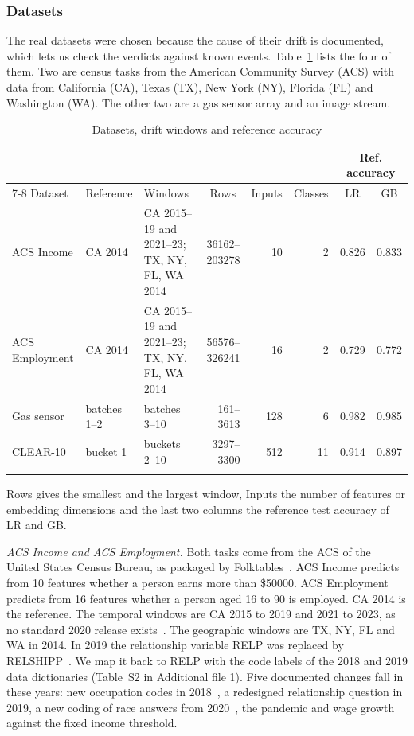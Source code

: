 \documentclass[pdflatex,referee,lineno,sn-basic]{sn-jnl}
\begin{document}
\subsubsection{Datasets}\label{sec:datasets}

The real datasets were chosen because the cause of their drift is documented, which lets us check the verdicts against known events. Table~\ref{tab:datasets} lists the four of them. Two are census tasks from the American Community Survey (ACS) with data from California (CA), Texas (TX), New York (NY), Florida (FL) and Washington (WA). The other two are a gas sensor array and an image stream.

\begin{table}[!htbp]\centering\tablebodyfont
\caption{Datasets, drift windows and reference accuracy}\label{tab:datasets}%
\setlength{\tabcolsep}{4pt}
\begin{tabularx}{\textwidth}{@{}ll>{\raggedright\arraybackslash}Xrrrrr@{}}
\toprule
 &  &  & \multicolumn{1}{c}{} & \multicolumn{1}{c}{} & \multicolumn{1}{c}{} & \multicolumn{2}{c}{Ref. accuracy} \\
\cmidrule(lr){7-8}
Dataset & Reference & Windows & \multicolumn{1}{c}{Rows} & \multicolumn{1}{c}{Inputs} & \multicolumn{1}{c}{Classes} & \multicolumn{1}{c}{LR} & \multicolumn{1}{c}{GB} \\
\midrule
ACS Income & CA 2014 & CA 2015--19 and 2021--23; TX, NY, FL, WA 2014 & 36162--203278 & 10 & 2 & 0.826 & 0.833 \\
ACS Employment & CA 2014 & CA 2015--19 and 2021--23; TX, NY, FL, WA 2014 & 56576--326241 & 16 & 2 & 0.729 & 0.772 \\
Gas sensor & batches 1--2 & batches 3--10 & 161--3613 & 128 & 6 & 0.982 & 0.985 \\
CLEAR-10 & bucket 1 & buckets 2--10 & 3297--3300 & 512 & 11 & 0.914 & 0.897 \\
\botrule
\end{tabularx}
\end{table}

Rows gives the smallest and the largest window, Inputs the number of features or embedding dimensions and the last two columns the reference test accuracy of LR and GB.

\emph{ACS Income and ACS Employment.} Both tasks come from the ACS of the United States Census Bureau, as packaged by Folktables~\citep{ding2021retiring}. ACS Income predicts from 10 features whether a person earns more than \$50000. ACS Employment predicts from 16 features whether a person aged 16 to 90 is employed. CA 2014 is the reference. The temporal windows are CA 2015 to 2019 and 2021 to 2023, as no standard 2020 release exists~\citep{census2021experimental}. The geographic windows are TX, NY, FL and WA in 2014. In 2019 the relationship variable RELP was replaced by RELSHIPP~\citep{census2019pums}. We map it back to RELP with the code labels of the 2018 and 2019 data dictionaries (Table~S2 in Additional file 1). Five documented changes fall in these years: new occupation codes in 2018~\citep{census2020occupation}, a redesigned relationship question in 2019, a new coding of race answers from 2020~\citep{census2021race}, the pandemic and wage growth against the fixed income threshold.
\end{document}

